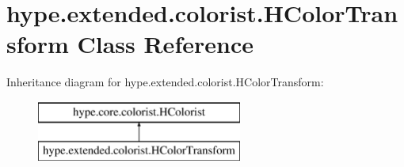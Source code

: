 \hypertarget{classhype_1_1extended_1_1colorist_1_1_h_color_transform}{\section{hype.\-extended.\-colorist.\-H\-Color\-Transform Class Reference}
\label{classhype_1_1extended_1_1colorist_1_1_h_color_transform}
}
Inheritance diagram for hype.\-extended.\-colorist.\-H\-Color\-Transform\-:\begin{figure}[H]
\begin{center}
\leavevmode
\includegraphics[height=2.000000cm]{classhype_1_1extended_1_1colorist_1_1_h_color_transform}
\end{center}
\end{figure}
